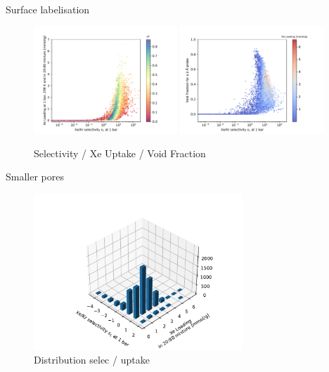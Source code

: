 \documentclass[main.tex]{subfiles}
\begin{document}
Surface labelisation



\begin{figure}[ht]
  \centering
  \includegraphics[width=0.48\textwidth]{figures/2-thermo/Scatterplot_uptake_selectivity_vol.pdf}
  \includegraphics[width=0.48\textwidth]{figures/2-thermo/Scatterplot_vol_selectivity.pdf}
  \caption{Selectivity / Xe Uptake / Void Fraction}\label{fgr:vol}
\end{figure}

Smaller pores

\begin{figure}[ht]
  \centering
  \includegraphics[width=0.7\textwidth]{figures/2-thermo/3D_hist_selec_uptake.pdf}
  \caption{Distribution selec / uptake}
\end{figure}
\end{document}
